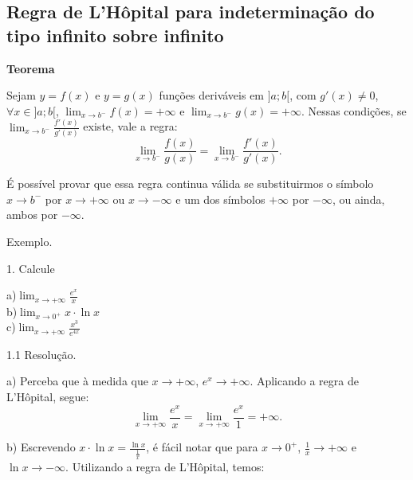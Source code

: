 \documentclass{article}
\begin{document}
{\begin{newpage}
\subsection{Regra de L'Hôpital para indeterminação do tipo infinito sobre infinito}
\hspace{12pt}\textbf{Teorema}
\par Sejam $y=f(x)$ e $y=g(x)$ funções deriváveis em $]a;b[$, com $g'(x)\neq 0$, $\forall x\in ]a;b[$, $\displaystyle{\lim_{x\to b^{-}} f(x) = +\infty }$ e $\displaystyle{\lim_{x\to b^{-}} g(x) = +\infty }$. Nessas condições, se $\displaystyle{\lim_{x\to b^{-}} \frac{f'(x)}{g'(x)}}$ existe, vale a regra:
$$\displaystyle{\lim_{x\to b^{-}} \frac{f(x)}{g(x)} = \lim_{x\to b^{-}} \frac{f'(x)}{g'(x)}}.$$
\par É possível provar que essa regra continua válida se substituirmos o símbolo $x\rightarrow b^{-}$ por $x\rightarrow +\infty $ ou $x\rightarrow -\infty $ e um dos símbolos $+\infty $ por $-\infty $, ou ainda, ambos por $-\infty $.
\par
\vspace{0.3cm}
Exemplo.
\vspace{0.3cm}
\begin{flushleft}
1. Calcule
\end{flushleft}
\par
\begin{multicols}{3}
a)$\displaystyle{\lim_{x\to +\infty } \frac{e^x}{x}}$ \\
b)$\displaystyle{\lim_{x\to 0^{+}} x\cdot\ln{x}}$ \\
c)$\displaystyle{\lim_{x\to +\infty } \frac{x^3}{e^{4x}}}$
\end{multicols}
\par
\vspace{0.3cm}
\begin{flushleft}
1.1 Resolução.
\end{flushleft}
\par
a) Perceba que à medida que $x\rightarrow +\infty$, $e^{x}\rightarrow +\infty $. Aplicando a regra de L'Hôpital, segue:
\begin{equation*} \displaystyle{\lim_{x\to +\infty } \frac{e^x}{x} = \lim_{x\to +\infty } \frac{e^x}{1} = +\infty }.\end{equation*}
\par
\vspace{0.3cm}
b) Escrevendo $\displaystyle{x\cdot\ln{x} = \frac{\ln{x}}{\frac{1}{x}}}$, é fácil notar que para $x\rightarrow 0^{+}$, $\frac{1}{x}\rightarrow +\infty $ e $\ln{x}\rightarrow -\infty $. Utilizando a regra de L'Hôpital, temos:

\end{newpage}}
\end{document}
